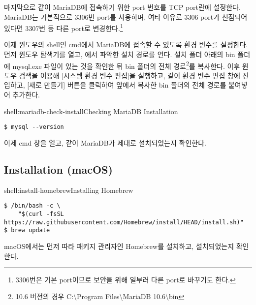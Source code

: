 마지막으로 \와 같이 MariaDB에 접속하기 위한 port 번호를 TCP port란에 설정한다. MariaDB는 기본적으로 3306번 port를 사용하며, 여타 이유로 3306 port가 선점되어 있다면 3307번 등 다른 port로 변경한다.\footnote{3306번은 기본 port이므로 보안을 위해 일부러 다른 port로 바꾸기도 한다.}


이제 윈도우의 shell인 cmd에서 MariaDB에 접속할 수 있도록 환경 변수를 설정한다. 먼저 윈도우 탐색기를 열고, 에서 파악한 설치 경로를 연다. 설치 폴더 아래의 bin 폴더에 mysql.exe 파일이 있는 것을 확인한 뒤 bin 폴더의 전체 경로\footnote{10.6 버전의 경우 C:\textbackslash{}Program Files\textbackslash{}MariaDB 10.6\textbackslash{}bin}를 복사한다. 이후 윈도우 검색을 이용해 [시스템 환경 변수 편집]을 실행하고, \과 같이 환경 변수 편집 창에 진입하고, [새로 만들기] 버튼을 클릭하여 앞에서 복사한 bin 폴더의 전체 경로를 붙여넣어 추가한다.

\begin{shellenv}{shell:mariadb-check-install}{Checking MariaDB Installation}\begin{verbatim}
$ mysql --version
\end{verbatim}
\end{shellenv}

이제 cmd 창을 열고, \와 같이 MariaDB가 제대로 설치되었는지 확인한다.

\subsection*{Installation (macOS)}

\begin{shellenv}{shell:install-homebrew}{Installing Homebrew}\begin{verbatim}
$ /bin/bash -c \
    "$(curl -fsSL https://raw.githubusercontent.com/Homebrew/install/HEAD/install.sh)"
$ brew update
\end{verbatim}
\end{shellenv}

macOS에서는 먼저 \를 따라 패키지 관리자인 Homebrew를 설치하고, 설치되었는지 확인한다.

